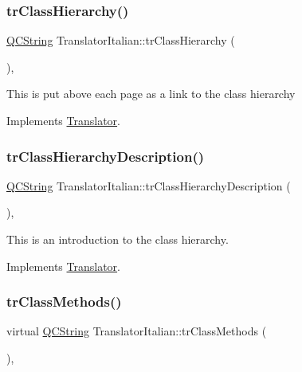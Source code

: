 \subsubsection{\texorpdfstring{trClassHierarchy()}{trClassHierarchy()}}
{\footnotesize\ttfamily \mbox{\hyperlink{class_q_c_string}{Q\+C\+String}} Translator\+Italian\+::tr\+Class\+Hierarchy (\begin{DoxyParamCaption}{ }\end{DoxyParamCaption})\hspace{0.3cm}{\ttfamily [inline]}, {\ttfamily [virtual]}}

This is put above each page as a link to the class hierarchy 

Implements \mbox{\hyperlink{class_translator}{Translator}}.

\mbox{\label{class_translator_italian_aac8a9a87c149343a78fef579c2593c2b}} 
\subsubsection{\texorpdfstring{trClassHierarchyDescription()}{trClassHierarchyDescription()}}
{\footnotesize\ttfamily \mbox{\hyperlink{class_q_c_string}{Q\+C\+String}} Translator\+Italian\+::tr\+Class\+Hierarchy\+Description (\begin{DoxyParamCaption}{ }\end{DoxyParamCaption})\hspace{0.3cm}{\ttfamily [inline]}, {\ttfamily [virtual]}}

This is an introduction to the class hierarchy. 

Implements \mbox{\hyperlink{class_translator}{Translator}}.

\mbox{\label{class_translator_italian_a273c45547daf5158e140d6db151ee7c9}} 
\subsubsection{\texorpdfstring{trClassMethods()}{trClassMethods()}}
{\footnotesize\ttfamily virtual \mbox{\hyperlink{class_q_c_string}{Q\+C\+String}} Translator\+Italian\+::tr\+Class\+Methods (\begin{DoxyParamCaption}{ }\end{DoxyParamCaption})\hspace{0.3cm}{\ttfamily [inline]}, {\ttfamily [virtual]}}

